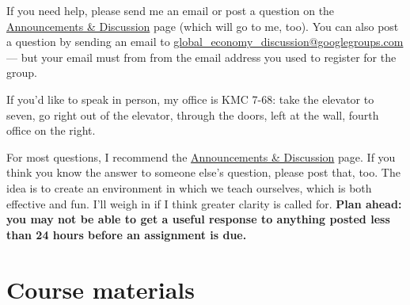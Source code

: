 \documentclass[12pt]{article}
\begin{document}
If you need help, please send me an email or post a question
on the
\href{https://sites.google.com/site/nyusternglobal/home/announcements}{Announcements \& Discussion}
page (which will go to me, too).
You can also post a question by sending an email to
\href{mailto:global_economy_discussion@googlegroups.com}{global\_economy\_discussion@googlegroups.com}
--- but your email must from from the email address you used to register for the group.

If you'd like to speak in person, my office is KMC 7-68:
take the elevator to seven,
go right out of the elevator, through the doors, left at the wall, fourth office on the right.


For most questions, I recommend the
\href{https://sites.google.com/site/nyusternglobal/home/announcements}{Announcements \& Discussion}
page.
If you think you know the answer to someone else's question, please post that, too.
The idea is to create an environment in which we teach ourselves,
which is both effective and fun.
I'll weigh in if I think greater clarity is called for.
{\bf Plan ahead:  you may not be able to get a useful response to anything posted
less than 24 hours before an assignment is due.}


\section{Course materials}
\end{document}

